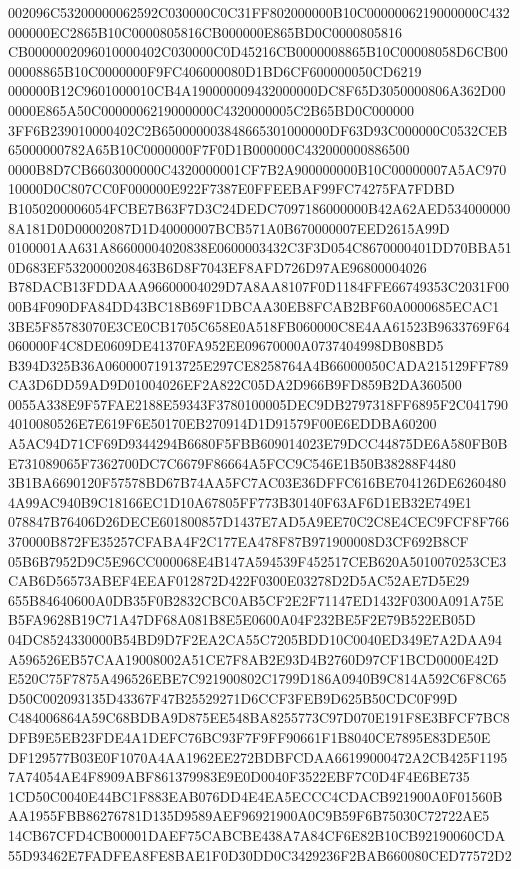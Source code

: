 \documentclass[UTF8,fontset=fandol,zihao=-4,a4paper]{ctexart}
\begin{document}
{{002096C53200000062592C030000C0C31FF802000000B10C0000006219000000C432000000EC2865B10C0000805816CB000000E865BD0C0000805816
CB0000002096010000402C030000C0D45216CB0000008865B10C00008058D6CB0000008865B10C0000000F9FC406000080D1BD6CF600000050CD6219
000000B12C9601000010CB4A190000009432000000DC8F65D3050000806A362D000000E865A50C0000006219000000C4320000005C2B65BD0C000000
3FF6B239010000402C2B650000003848665301000000DF63D93C000000C0532CEB65000000782A65B10C0000000F7F0D1B000000C432000000886500
0000B8D7CB6603000000C4320000001CF7B2A900000000B10C00000007A5AC97010000D0C807CC0F000000E922F7387E0FFEEBAF99FC74275FA7FDBD
B1050200006054FCBE7B63F7D3C24DEDC7097186000000B42A62AED5340000008A181D0D00002087D1D40000007BCB571A0B670000007EED2615A99D
0100001AA631A86600004020838E0600003432C3F3D054C8670000401DD70BBA510D683EF5320000208463B6D8F7043EF8AFD726D97AE96800004026
B78DACB13FDDAAA96600004029D7A8AA8107F0D1184FFE66749353C2031F0000B4F090DFA84DD43BC18B69F1DBCAA30EB8FCAB2BF60A0000685ECAC1
3BE5F85783070E3CE0CB1705C658E0A518FB060000C8E4AA61523B9633769F64060000F4C8DE0609DE41370FA952EE09670000A0737404998DB08BD5
B394D325B36A06000071913725E297CE8258764A4B66000050CADA215129FF789CA3D6DD59AD9D01004026EF2A822C05DA2D966B9FD859B2DA360500
0055A338E9F57FAE2188E59343F3780100005DEC9DB2797318FF6895F2C0417904010080526E7E619F6E50170EB270914D1D91579F00E6EDDBA60200
A5AC94D71CF69D9344294B6680F5FBB609014023E79DCC44875DE6A580FB0BE731089065F7362700DC7C6679F86664A5FCC9C546E1B50B38288F4480
3B1BA6690120F57578BD67B74AA5FC7AC03E36DFFC616BE704126DE62604804A99AC940B9C18166EC1D10A67805FF773B30140F63AF6D1EB32E749E1
078847B76406D26DECE601800857D1437E7AD5A9EE70C2C8E4CEC9FCF8F766370000B872FE35257CFABA4F2C177EA478F87B971900008D3CF692B8CF
05B6B7952D9C5E96CC000068E4B147A594539F452517CEB620A5010070253CE3CAB6D56573ABEF4EEAF012872D422F0300E03278D2D5AC52AE7D5E29
655B84640600A0DB35F0B2832CBC0AB5CF2E2F71147ED1432F0300A091A75EB5FA9628B19C71A47DF68A081B8E5E0600A04F232BE5F2E79B522EB05D
04DC8524330000B54BD9D7F2EA2CA55C7205BDD10C0040ED349E7A2DAA94A596526EB57CAA19008002A51CE7F8AB2E93D4B2760D97CF1BCD0000E42D
E520C75F7875A496526EBE7C921900802C1799D186A0940B9C814A592C6F8C65D50C002093135D43367F47B25529271D6CCF3FEB9D625B50CDC0F99D
C484006864A59C68BDBA9D875EE548BA8255773C97D070E191F8E3BFCF7BC8DFB9E5EB23FDE4A1DEFC76BC93F7F9FF90661F1B8040CE7895E83DE50E
DF129577B03E0F1070A4AA1962EE272BDBFCDAA66199000472A2CB425F11957A74054AE4F8909ABF861379983E9E0D0040F3522EBF7C0D4F4E6BE735
1CD50C0040E44BC1F883EAB076DD4E4EA5ECCC4CDACB921900A0F01560BAA1955FBB86276781D135D9589AEF96921900A0C9B59F6B75030C72722AE5
14CB67CFD4CB00001DAEF75CABCBE438A7A84CF6E82B10CB92190060CDA55D93462E7FADFEA8FE8BAE1F0D30DD0C3429236F2BAB660080CED77572D2
}}
\end{document}
